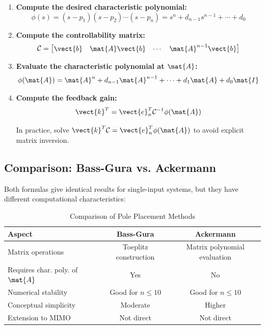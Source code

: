 \begin{enumerate}
    \item \textbf{Compute the desired characteristic polynomial:}
    \begin{equation}
    \phi(s) = (s - p_1)(s - p_2)\cdots(s - p_n) = s^n + d_{n-1}s^{n-1} + \cdots + d_0
    \end{equation}

    \item \textbf{Compute the controllability matrix:}
    \begin{equation}
    \mathcal{C} = \begin{bmatrix} \vect{b} & \mat{A}\vect{b} & \cdots & \mat{A}^{n-1}\vect{b} \end{bmatrix}
    \end{equation}

    \item \textbf{Evaluate the characteristic polynomial at $\mat{A}$:}
    \begin{equation}
    \phi(\mat{A}) = \mat{A}^n + d_{n-1}\mat{A}^{n-1} + \cdots + d_1\mat{A} + d_0\mat{I}
    \end{equation}

    \item \textbf{Compute the feedback gain:}
    \begin{equation}
    \vect{k}^T = \vect{e}_n^T\mathcal{C}^{-1}\phi(\mat{A})
    \end{equation}

    In practice, solve $\vect{k}^T\mathcal{C} = \vect{e}_n^T\phi(\mat{A})$ to avoid explicit matrix inversion.
\end{enumerate}

\subsection{Comparison: Bass-Gura vs. Ackermann}

Both formulas give identical results for single-input systems, but they have different computational characteristics:

\begin{table}[htbp]
\centering
\caption{Comparison of Pole Placement Methods}
\label{tab:pole_placement_comparison}
\begin{tabular}{lcc}
\toprule
\textbf{Aspect} & \textbf{Bass-Gura} & \textbf{Ackermann} \\
\midrule
Matrix operations & Toeplitz construction & Matrix polynomial evaluation \\
Requires char. poly. of $\mat{A}$ & Yes & No \\
Numerical stability & Good for $n \leq 10$ & Good for $n \leq 10$ \\
Conceptual simplicity & Moderate & Higher \\
Extension to MIMO & Not direct & Not direct \\
\bottomrule
\end{tabular}
\end{table}

